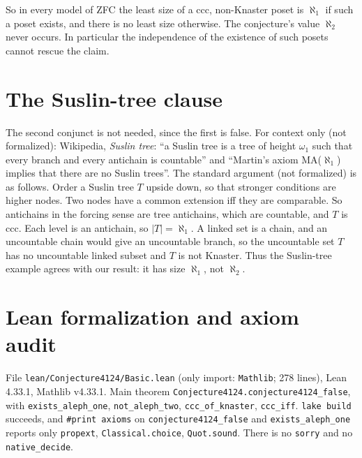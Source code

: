 \documentclass[11pt]{article}
\theoremstyle{definition}
\begin{document}
So in every model of ZFC the least size of a ccc, non-Knaster poset is $\aleph_1$ if such a poset
exists, and there is no least size otherwise. The conjecture's value $\aleph_2$ never occurs. In
particular the independence of the existence of such posets cannot rescue the claim.

\section{The Suslin-tree clause}\label{sec:suslin}
The second conjunct is not needed, since the first is false. For context only (not formalized):
Wikipedia, \emph{Suslin tree}: ``a Suslin tree is a tree of height $\omega_1$ such that every
branch and every antichain is countable'' and ``Martin's axiom MA($\aleph_1$) implies that there
are no Suslin trees''. The standard argument (not formalized) is as follows. Order a Suslin tree $T$
upside down, so that stronger conditions are higher nodes. Two nodes have a common extension iff they
are comparable. So antichains in the forcing sense are tree antichains, which are countable, and
$T$ is ccc. Each level is an antichain, so $|T|=\aleph_1$. A linked set is a chain, and an
uncountable chain would give an uncountable branch, so the uncountable set $T$ has no
uncountable linked subset and $T$ is not Knaster. Thus the Suslin-tree example agrees with our
result: it has size $\aleph_1$, not $\aleph_2$.

\section{Lean formalization and axiom audit}
File \texttt{lean/Conjecture4124/Basic.lean} (only import: \texttt{Mathlib}; 278 lines), Lean
4.33.1, Mathlib v4.33.1. Main theorem \texttt{Conjecture4124.conjecture4124\_false}, with
\texttt{exists\_aleph\_one}, \texttt{not\_aleph\_two}, \texttt{ccc\_of\_knaster}, \texttt{ccc\_iff}.
\texttt{lake build} succeeds, and \texttt{\#print axioms} on \texttt{conjecture4124\_false} and
\texttt{exists\_aleph\_one} reports only \texttt{propext}, \texttt{Classical.choice},
\texttt{Quot.sound}. There is no \texttt{sorry} and no \texttt{native\_decide}.
\end{document}

